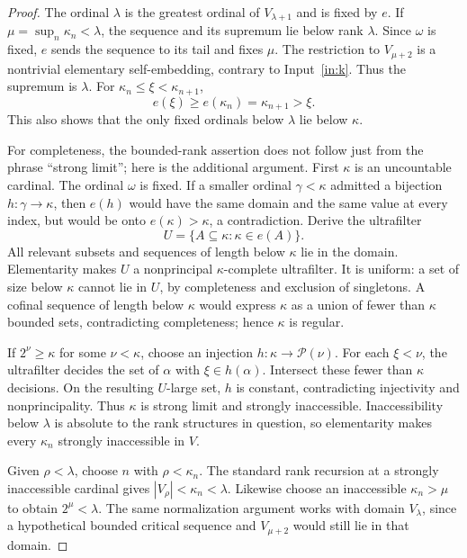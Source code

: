 \documentclass[11pt,letterpaper]{article}
\theoremstyle{definition}
\numberwithin{equation}{section}
\newcommand{\Pow}{\mathcal P}
\begin{document}
\begin{proof}
The ordinal $\lambda$ is the greatest ordinal of $V_{\lambda+1}$ and is fixed by $e$. If $\mu=\sup_n\kappa_n<\lambda$, the sequence and its supremum lie below rank $\lambda$. Since $\omega$ is fixed, $e$ sends the sequence to its tail and fixes $\mu$. The restriction to $V_{\mu+2}$ is a nontrivial elementary self-embedding, contrary to Input~\ref{in:k}. Thus the supremum is $\lambda$. For $\kappa_n\le\xi<\kappa_{n+1}$,
\[
e(\xi)\ge e(\kappa_n)=\kappa_{n+1}>\xi.
\]
This also shows that the only fixed ordinals below $\lambda$ lie below $\kappa$.

For completeness, the bounded-rank assertion does not follow just from the phrase ``strong limit''; here is the additional argument. First $\kappa$ is an uncountable cardinal. The ordinal $\omega$ is fixed. If a smaller ordinal $\gamma<\kappa$ admitted a bijection $h:\gamma\to\kappa$, then $e(h)$ would have the same domain and the same value at every index, but would be onto $e(\kappa)>\kappa$, a contradiction. Derive the ultrafilter
\[
U=\{A\subseteq\kappa:\kappa\in e(A)\}.
\]
All relevant subsets and sequences of length below $\kappa$ lie in the domain. Elementarity makes $U$ a nonprincipal $\kappa$-complete ultrafilter. It is uniform: a set of size below $\kappa$ cannot lie in $U$, by completeness and exclusion of singletons. A cofinal sequence of length below $\kappa$ would express $\kappa$ as a union of fewer than $\kappa$ bounded sets, contradicting completeness; hence $\kappa$ is regular.

If $2^\nu\ge\kappa$ for some $\nu<\kappa$, choose an injection $h:\kappa\to\Pow(\nu)$. For each $\xi<\nu$, the ultrafilter decides the set of $\alpha$ with $\xi\in h(\alpha)$. Intersect these fewer than $\kappa$ decisions. On the resulting $U$-large set, $h$ is constant, contradicting injectivity and nonprincipality. Thus $\kappa$ is strong limit and strongly inaccessible. Inaccessibility below $\lambda$ is absolute to the rank structures in question, so elementarity makes every $\kappa_n$ strongly inaccessible in $V$.

Given $\rho<\lambda$, choose $n$ with $\rho<\kappa_n$. The standard rank recursion at a strongly inaccessible cardinal gives $|V_\rho|<\kappa_n<\lambda$. Likewise choose an inaccessible $\kappa_n>\mu$ to obtain $2^\mu<\lambda$. The same normalization argument works with domain $V_\lambda$, since a hypothetical bounded critical sequence and $V_{\mu+2}$ would still lie in that domain.
\end{proof}
\end{document}
